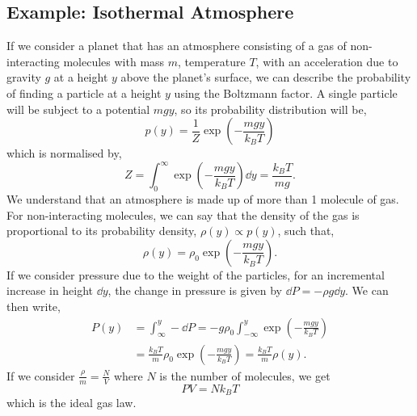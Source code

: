 \documentclass{book}
\begin{document}
\subsection{Example: Isothermal Atmosphere}
If we consider a planet that has an atmosphere consisting of a gas of non-interacting molecules with mass $m$, temperature $T$, with an acceleration due to gravity $g$ at a height $y$ above the planet's surface, we can describe the probability of finding a particle at a height $y$ using the Boltzmann factor. A single particle will be subject to a potential $mgy$, so its probability distribution will be,
\begin{equation}
	p(y) = \frac{1}{Z} \exp \left(-\frac{mgy}{k_BT}\right)
\end{equation}
which is normalised by,
\begin{equation}
	Z = \int_0^\infty \exp\left(-\frac{mgy}{k_BT}\right) \dd{y} = \frac{k_BT}{mg}.
\end{equation}
We understand that an atmosphere is made up of more than 1 molecule of gas. For non-interacting molecules, we can say that the density of the gas is proportional to its probability density, $\rho(y) \propto p(y)$, such that,
\begin{equation}
	\rho(y) = \rho_0 \exp \left(-\frac{mgy}{k_BT}\right).
\end{equation}
If we consider pressure due to the weight of the particles, for an incremental increase in height $\dd{y}$, the change in pressure is given by $\dd{P} = - \rho g \dd{y}$. We can then write,
\begin{equation}
	\begin{split}
		P(y) & = \int_{\infty}^{y}-\dd{P} = -g\rho_0 \int_{-\infty}^{y}\exp\left(-\frac{mgy}{k_BT}\right) \\
		& = \frac{k_BT}{m}\rho_0 \exp\left(-\frac{mgy}{k_BT}\right)  = \frac{k_BT}{m}\rho(y).
	\end{split}
\end{equation}
If we consider $\frac{\rho}{m} = \frac{N}{V}$ where $N$ is the number of molecules, we get
\begin{equation}
	PV = Nk_BT
\end{equation}
which is the ideal gas law.
\end{document}

